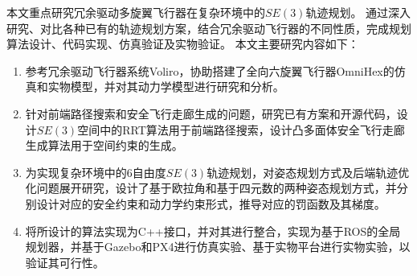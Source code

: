 本文重点研究冗余驱动多旋翼飞行器在复杂环境中的$SE(3)$轨迹规划。
通过深入研究、对比各种已有的轨迹规划方案，结合冗余驱动飞行器的不同性质，完成规划算法设计、代码实现、仿真验证及实物验证。
本文主要研究内容如下：
\begin{enumerate}
    \renewcommand{\labelenumi}{(\theenumi)}
    \item 参考冗余驱动飞行器系统Voliro\cite{kamel2018voliro}，协助搭建了全向六旋翼飞行器OmniHex的仿真和实物模型，并对其动力学模型进行研究和分析。
    \item 针对前端路径搜索和安全飞行走廊生成的问题，研究已有方案和开源代码，设计$SE(3)$空间中的RRT算法用于前端路径搜索，设计凸多面体安全飞行走廊生成算法用于空间约束的生成。
    \item 为实现复杂环境中的6自由度$SE(3)$轨迹规划，对姿态规划方式及后端轨迹优化问题展开研究，设计了基于欧拉角和基于四元数的两种姿态规划方式，并分别设计对应的安全约束和动力学约束形式，推导对应的罚函数及其梯度。
    \item 将所设计的算法实现为C++接口，并对其进行整合，实现为基于ROS\cite{quigley2009ros}的全局规划器，并基于Gazebo\cite{gazebo}和PX4\cite{meier2015px4}进行仿真实验、基于实物平台进行实物实验，以验证其可行性。
\end{enumerate}

